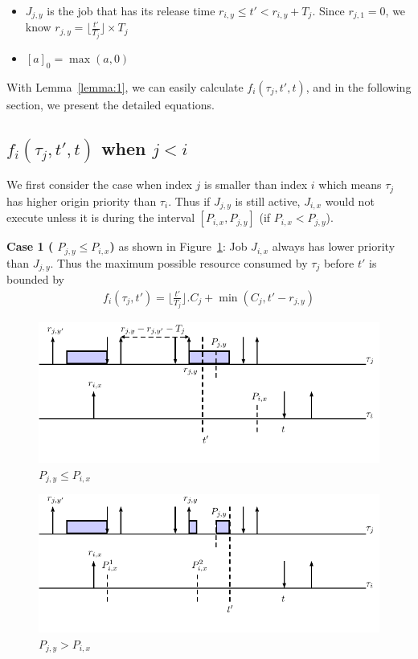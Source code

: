 \begin{itemize}
	\item $J_{j,y}$ is the job that has its release time $r_{i,y}\leq t'<r_{i,y}+T_j$. Since $r_{j,1}=0$, we know $r_{j,y}=\lfloor \frac{t'}{T_j}\rfloor\times T_j$
	\item $[a]_0=\max(a,0)$
\end{itemize}

With Lemma~\ref{lemma:1}, we can easily calculate $f_i(\tau_j,t',t)$, and in the following section, we present the detailed equations.
\subsection{$f_i(\tau_j,t',t)$ when $j<i$}
We first consider the case when index $j$ is smaller than index $i$ which means $\tau_j$ has higher origin priority than $\tau_i$. Thus if  $J_{j,y}$ is still active, $J_{i,x}$ would not  execute unless it is during the interval $[P_{i,x}, P_{j,y}]$ (if $P_{i,x}<P_{j,y}$).


\textbf{Case 1 ( $P_{j,y}\leq P_{i,x}$)} as shown in  Figure~\ref{fig:case1}: Job $J_{i,x}$ always has lower priority than  $J_{j,y}$. Thus   the maximum possible resource consumed by $\tau_{j}$  before $t'$ is  bounded by
	\begin{align*}
		f_i(\tau_j,t')=\lfloor \frac{t'}{T_j}\rfloor.C_j +\min\left(C_j,t'-r_{j,y}\right)
	\end{align*}
 

\begin{figure}[h!]
 \centering
\includegraphics[scale=0.7]{Figure/C1}  
\caption{$ P_{j,y}\leq P_{i,x}$}
  \label{fig:case1}
\end{figure}






\begin{figure}[h!]
 \centering
\includegraphics[scale=0.7]{Figure/C2}  
\caption{$P_{j,y}> P_{i,x}$}
  \label{fig:case2}
\end{figure}

